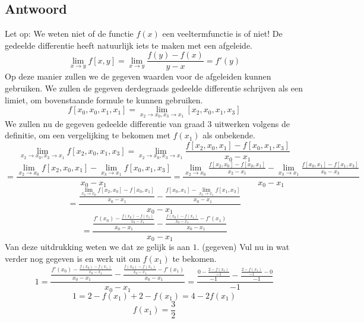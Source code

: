 \documentclass[examenvragen.tex]{subfiles}
\begin{document}
\subsection{Antwoord}
Let op: We weten niet of de functie $f(x)$ een veeltermfunctie is of niet!
De gedeelde differentie heeft natuurlijk iets te maken met een afgeleide.
\[
\lim_{x\rightarrow y}f[x,y] = \lim_{x\rightarrow y}\frac{f(y)-f(x)}{y-x} = f'(y)
\]
Op deze manier zullen we de gegeven waarden voor de afgeleiden kunnen gebruiken.
We zullen de gegeven derdegraads gedeelde differentie schrijven als een limiet, om bovenstaande formule te kunnen gebruiken.
\[
f[x_0,x_0,x_1,x_1] = \lim_{x_2\rightarrow x_0, x_3 \rightarrow x_1}[x_2,x_0,x_1,x_3]
\]
We zullen nu de gegeven gedeelde differentie van graad $3$ uitwerken volgens de definitie, om een vergelijking te bekomen met $f(x_1)$ als onbekende.
\[
\lim_{x_2\rightarrow x_0, x_3 \rightarrow x_1}
f[x_2,x_0,x_1,x_3]
=
\lim_{x_2\rightarrow x_0, x_3 \rightarrow x_1}
\frac
{f[x_2,x_0,x_1]-f[x_0,x_1,x_3]}
{x_0-x_1}
\]
\[
=
\frac
{\lim_{x_2\rightarrow x_0}f[x_2,x_0,x_1]-\lim_{x_3 \rightarrow x_1}f[x_0,x_1,x_3]}
{x_0-x_1}
=
\frac
{
\lim_{x_2\rightarrow x_0}
\frac{f[x_2,x_0]-f[x_0,x_1]}{x_2-x_1}
-
\lim_{x_3 \rightarrow x_1}\frac{f[x_0,x_1]-f[x_1,x_3]}{x_0-x_3}
}
{x_0-x_1}
\]
\[
=
\frac
{
\frac{\lim_{x_2\rightarrow x_0}f[x_2,x_0]-f[x_0,x_1]}{x_0-x_1}
-
\frac{f[x_0,x_1]-\lim_{x_3 \rightarrow x_1}f[x_1,x_3]}{x_0-x_1}
}
{x_0-x_1}
\]
\[
=
\frac
{
\frac{f'(x_0)-\frac{f(x_0)-f(x_1)}{x_0-x_1}}{x_0-x_1}
-
\frac{\frac{f(x_0)-f(x_1)}{x_0-x_1}-f'(x_1)}{x_0-x_1}
}
{x_0-x_1}
\]
Van deze uitdrukking weten we dat ze gelijk is aan $1$. (gegeven)
Vul nu in wat verder nog gegeven is en werk uit om $f(x_1)$ te bekomen.
\[
1
=
\frac
{
\frac{f'(x_0)-\frac{f(x_0)-f(x_1)}{x_0-x_1}}{x_0-x_1}
-
\frac{\frac{f(x_0)-f(x_1)}{x_0-x_1}-f'(x_1)}{x_0-x_1}
}
{x_0-x_1}
=
\frac
{
\frac{0-\frac{2-f(x_1)}{-1}}{-1}
-
\frac{\frac{2-f(x_1)}{-1}-0}{-1}
}
{-1}
\]
\[
1
=
2-f(x_1)+
2-f(x_1)
= 4-2f(x_1)
\]
\[
f(x_1) = \frac{3}{2}
\]
\end{document}
